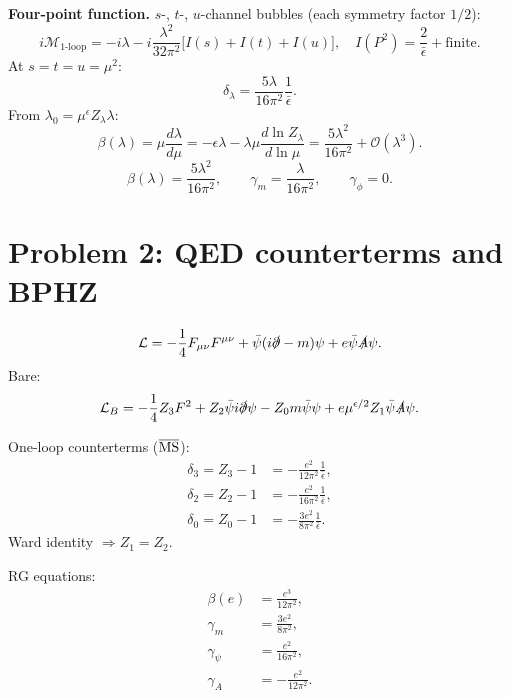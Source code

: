 \documentclass{article}
\begin{document}
\noindent\textbf{Four-point function.} $s$-, $t$-, $u$-channel bubbles (each symmetry factor $1/2$):
\begin{equation}
i\mathcal{M}_{1\text{-loop}} = -i\lambda - i\frac{\lambda^2}{32\pi^2}\bigl[I(s)+I(t)+I(u)\bigr],\quad I(P^2)=\frac{2}{\bar\epsilon}+\text{finite}.
\end{equation}
At $s=t=u=\mu^2$:
\begin{equation}
\delta_\lambda = \frac{5\lambda}{16\pi^2}\frac{1}{\bar\epsilon}.
\end{equation}
From $\lambda_0=\mu^\epsilon Z_\lambda\lambda$:
\begin{equation}
\beta(\lambda) = \mu\frac{d\lambda}{d\mu} = -\epsilon\lambda - \lambda\mu\frac{d\ln Z_\lambda}{d\ln\mu}
= \frac{5\lambda^2}{16\pi^2}+\mathcal{O}(\lambda^3).
\end{equation}
\begin{equation}
\boxed{\beta(\lambda)=\frac{5\lambda^2}{16\pi^2},\qquad \gamma_m=\frac{\lambda}{16\pi^2},\qquad \gamma_\phi=0.}
\end{equation}

\section*{Problem 2: QED counterterms and BPHZ}

\begin{equation}
\mathcal{L} = -\frac14 F_{\mu\nu}F^{\mu\nu} + \bar\psi(i\slashed\partial-m)\psi + e\bar\psi\slashed A\psi.
\end{equation}
Bare:
\begin{equation}
\mathcal{L}_B = -\frac14 Z_3 F^2 + Z_2\bar\psi i\slashed\partial\psi - Z_0 m\bar\psi\psi + e\mu^{\epsilon/2}Z_1\bar\psi\slashed A\psi.
\end{equation}

One-loop counterterms ($\overline{\rm MS}$):
\begin{align}
\delta_3 = Z_3-1 &= -\frac{e^2}{12\pi^2}\frac{1}{\bar\epsilon},\\
\delta_2 = Z_2-1 &= -\frac{e^2}{16\pi^2}\frac{1}{\bar\epsilon},\\
\delta_0 = Z_0-1 &= -\frac{3e^2}{8\pi^2}\frac{1}{\bar\epsilon}.
\end{align}
Ward identity $\Rightarrow Z_1=Z_2$.

RG equations:
\begin{align}
\beta(e)   &= \frac{e^3}{12\pi^2},\\
\gamma_m   &= \frac{3e^2}{8\pi^2},\\
\gamma_\psi &= \frac{e^2}{16\pi^2},\\
\gamma_A   &= -\frac{e^2}{12\pi^2}.
\end{align}
\end{document}
